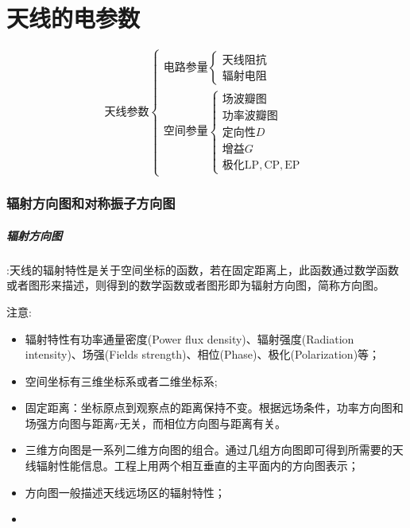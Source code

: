 \chapter{天线的电参数}
\begin{equation*}
\mbox{天线参数}
\begin{cases}
    \mbox{电路参量}
    \begin{cases}
        \mbox{天线阻抗}\\
        \mbox{辐射电阻}
    \end{cases}\\
    \mbox{空间参量}
    \begin{cases}
        \mbox{场波瓣图}\\
        \mbox{功率波瓣图}\\
        \mbox{定向性}D\\
        \mbox{增益}G\\
        \mbox{极化}\mathrm{LP},\mathrm{CP},\mathrm{EP}
    \end{cases}
\end{cases}
\end{equation*}

    \subsection{辐射方向图和对称振子方向图}
    \paragraph{辐射方向图}:天线的辐射特性是关于空间坐标的函数，若在固定距离上，此函数通过数学函数或者图形来描述，则得到的数学函数或者图形即为辐射方向图，简称方向图。

    注意:\begin{itemize}

        \item 辐射特性有功率通量密度(Power flux density)、辐射强度(Radiation intensity)、场强(Fields strength)、相位(Phase)、极化(Polarization)等；
        \item 空间坐标有三维坐标系或者二维坐标系;
        \item 固定距离：坐标原点到观察点的距离保持不变。根据远场条件，功率方向图和场强方向图与距离$r$无关，而相位方向图与距离有关。
        \item 三维方向图是一系列二维方向图的组合。通过几组方向图即可得到所需要的天线辐射性能信息。工程上用两个相互垂直的主平面内的方向图表示；
        \item 方向图一般描述天线远场区的辐射特性；
        \item 
    \end{itemize}
    
